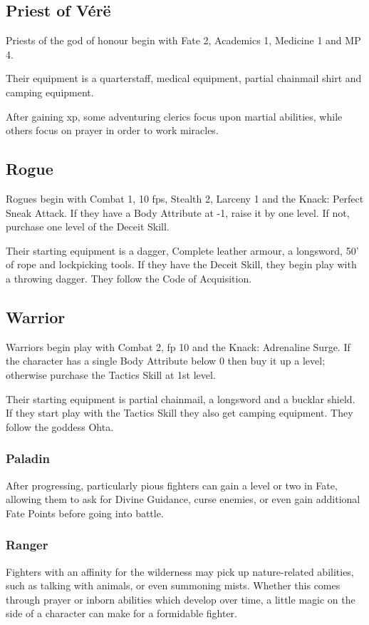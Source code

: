 \begin{multicols}{2}
\subsection{Priest of V\'{e}r\"{e}}

Priests of the god of honour begin with Fate 2, Academics 1, Medicine 1 and MP 4.

Their equipment is a quarterstaff, medical equipment, partial chainmail shirt and camping equipment.

After gaining \gls{xp}, some adventuring clerics focus upon martial abilities, while others focus on prayer in order to work miracles.

\subsection{Rogue}

Rogues begin with Combat 1, 10 \glspl{fp}, Stealth 2, Larceny 1 and the Knack: Perfect Sneak Attack.
If they have a Body Attribute at -1, raise it by one level.
If not, purchase one level of the Deceit Skill.

Their starting equipment is a dagger, Complete leather armour, a longsword, 50' of rope and lockpicking tools.
If they have the Deceit Skill, they begin play with a throwing dagger.
They follow the Code of Acquisition.

\subsection{Warrior}

Warriors begin play with Combat 2, \gls{fp} 10 and the Knack: Adrenaline Surge.
If the character has a single Body Attribute below 0 then buy it up a level; otherwise purchase the Tactics Skill at 1st level.

Their starting equipment is partial chainmail, a longsword and a bucklar shield.
If they start play with the Tactics Skill they also get camping equipment.
They follow the goddess Ohta.

\subsubsection{Paladin}

After progressing, particularly pious fighters can gain a level or two in Fate, allowing them to ask for Divine Guidance, curse enemies, or even gain additional Fate Points before going into battle.

\subsubsection{Ranger}

Fighters with an affinity for the wilderness may pick up nature-related abilities, such as talking with animals, or even summoning mists.
Whether this comes through prayer or inborn abilities which develop over time, a little magic on the side of a character can make for a formidable fighter.

\end{multicols}



